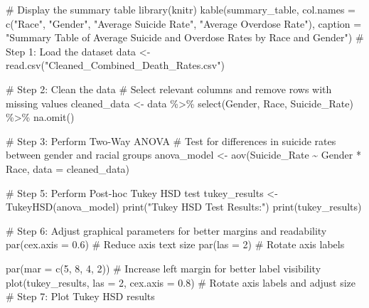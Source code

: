 \documentclass[
  letterpaper,
  DIV=11,
  numbers=noendperiod]{scrartcl}
\newenvironment{Shaded}{\begin{snugshade}}{\end{snugshade}}
\newcommand{\AttributeTok}[1]{\textcolor[rgb]{0.40,0.45,0.13}{#1}}
\newcommand{\CommentTok}[1]{\textcolor[rgb]{0.37,0.37,0.37}{#1}}
\newcommand{\DecValTok}[1]{\textcolor[rgb]{0.68,0.00,0.00}{#1}}
\newcommand{\FloatTok}[1]{\textcolor[rgb]{0.68,0.00,0.00}{#1}}
\newcommand{\FunctionTok}[1]{\textcolor[rgb]{0.28,0.35,0.67}{#1}}
\newcommand{\NormalTok}[1]{\textcolor[rgb]{0.00,0.23,0.31}{#1}}
\newcommand{\OtherTok}[1]{\textcolor[rgb]{0.00,0.23,0.31}{#1}}
\newcommand{\SpecialCharTok}[1]{\textcolor[rgb]{0.37,0.37,0.37}{#1}}
\newcommand{\StringTok}[1]{\textcolor[rgb]{0.13,0.47,0.30}{#1}}
\begin{document}
\begin{Shaded}
\begin{Highlighting}[]
\CommentTok{\# Display the summary table}
\FunctionTok{library}\NormalTok{(knitr)}
\FunctionTok{kable}\NormalTok{(summary\_table, }
      \AttributeTok{col.names =} \FunctionTok{c}\NormalTok{(}\StringTok{"Race"}\NormalTok{, }\StringTok{"Gender"}\NormalTok{, }\StringTok{"Average Suicide Rate"}\NormalTok{, }\StringTok{"Average Overdose Rate"}\NormalTok{),}
      \AttributeTok{caption =} \StringTok{"Summary Table of Average Suicide and Overdose Rates by Race and Gender"}\NormalTok{)}
\CommentTok{\# Step 1: Load the dataset}
\NormalTok{data }\OtherTok{\textless{}{-}} \FunctionTok{read.csv}\NormalTok{(}\StringTok{"Cleaned\_Combined\_Death\_Rates.csv"}\NormalTok{)}

\CommentTok{\# Step 2: Clean the data}
\CommentTok{\# Select relevant columns and remove rows with missing values}
\NormalTok{cleaned\_data }\OtherTok{\textless{}{-}}\NormalTok{ data }\SpecialCharTok{\%\textgreater{}\%}
  \FunctionTok{select}\NormalTok{(Gender, Race, Suicide\_Rate) }\SpecialCharTok{\%\textgreater{}\%}
  \FunctionTok{na.omit}\NormalTok{()}

\CommentTok{\# Step 3: Perform Two{-}Way ANOVA}
\CommentTok{\# Test for differences in suicide rates between gender and racial groups}
\NormalTok{anova\_model }\OtherTok{\textless{}{-}} \FunctionTok{aov}\NormalTok{(Suicide\_Rate }\SpecialCharTok{\textasciitilde{}}\NormalTok{ Gender }\SpecialCharTok{*}\NormalTok{ Race, }\AttributeTok{data =}\NormalTok{ cleaned\_data)}

\CommentTok{\# Step 5: Perform Post{-}hoc Tukey HSD test}
\NormalTok{tukey\_results }\OtherTok{\textless{}{-}} \FunctionTok{TukeyHSD}\NormalTok{(anova\_model)}
\FunctionTok{print}\NormalTok{(}\StringTok{"Tukey HSD Test Results:"}\NormalTok{)}
\FunctionTok{print}\NormalTok{(tukey\_results)}

\CommentTok{\# Step 6: Adjust graphical parameters for better margins and readability}
\FunctionTok{par}\NormalTok{(}\AttributeTok{cex.axis =} \FloatTok{0.6}\NormalTok{)        }\CommentTok{\# Reduce axis text size}
\FunctionTok{par}\NormalTok{(}\AttributeTok{las =} \DecValTok{2}\NormalTok{)      }\CommentTok{\# Rotate axis labels}

\FunctionTok{par}\NormalTok{(}\AttributeTok{mar =} \FunctionTok{c}\NormalTok{(}\DecValTok{5}\NormalTok{, }\DecValTok{8}\NormalTok{, }\DecValTok{4}\NormalTok{, }\DecValTok{2}\NormalTok{))  }\CommentTok{\# Increase left margin for better label visibility}
\FunctionTok{plot}\NormalTok{(tukey\_results, }\AttributeTok{las =} \DecValTok{2}\NormalTok{, }\AttributeTok{cex.axis =} \FloatTok{0.8}\NormalTok{)  }\CommentTok{\# Rotate axis labels and adjust size}
\CommentTok{\# Step 7: Plot Tukey HSD results}
\end{Highlighting}
\end{Shaded}
\end{document}
